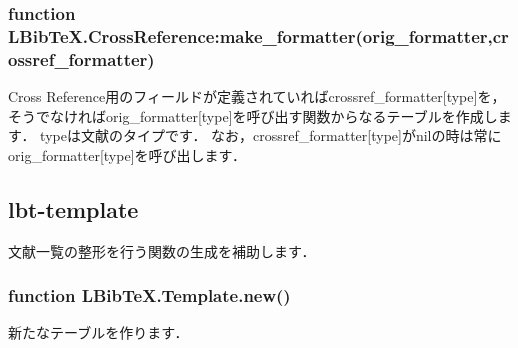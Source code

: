 \documentclass[a4paper]{ltjsarticle}
\begin{document}
\subsubsection{function LBibTeX.CrossReference:make\_formatter(orig\_formatter,crossref\_formatter)}
Cross Reference用のフィールドが定義されていればcrossref\_formatter[type]を，そうでなければorig\_formatter[type]を呼び出す関数からなるテーブルを作成します．
typeは文献のタイプです．
なお，crossref\_formatter[type]がnilの時は常にorig\_formatter[type]を呼び出します．

\subsection{lbt-template}
文献一覧の整形を行う関数の生成を補助します．

\subsubsection{function LBibTeX.Template.new()}
新たなテーブルを作ります．
\end{document}
